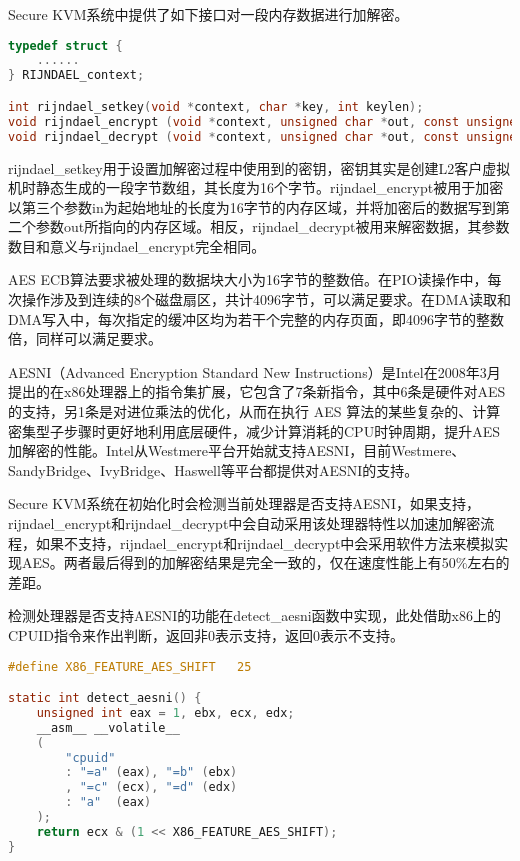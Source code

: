 Secure KVM系统中提供了如下接口对一段内存数据进行加解密。

\begin{lstlisting}[language={C}, caption={inject\_virtual\_ept\_fault实现源代码}]
typedef struct {
	......
} RIJNDAEL_context;

int rijndael_setkey(void *context, char *key, int keylen);
void rijndael_encrypt (void *context, unsigned char *out, const unsigned char *in);
void rijndael_decrypt (void *context, unsigned char *out, const unsigned char *in);
\end{lstlisting}

rijndael\_setkey用于设置加解密过程中使用到的密钥，密钥其实是创建L2客户虚拟机时静态生成的一段字节数组，其长度为16个字节。rijndael\_encrypt被用于加密以第三个参数in为起始地址的长度为16字节的内存区域，并将加密后的数据写到第二个参数out所指向的内存区域。相反，rijndael\_decrypt被用来解密数据，其参数数目和意义与rijndael\_encrypt完全相同。

AES ECB算法要求被处理的数据块大小为16字节的整数倍。在PIO读操作中，每次操作涉及到连续的8个磁盘扇区，共计4096字节，可以满足要求。在DMA读取和DMA写入中，每次指定的缓冲区均为若干个完整的内存页面，即4096字节的整数倍，同样可以满足要求。

AESNI（Advanced Encryption Standard New Instructions）是Intel在2008年3月提出的在x86处理器上的指令集扩展，它包含了7条新指令，其中6条是硬件对AES的支持，另1条是对进位乘法的优化，从而在执行 AES 算法的某些复杂的、计算密集型子步骤时更好地利用底层硬件，减少计算消耗的CPU时钟周期，提升AES加解密的性能。Intel从Westmere平台开始就支持AESNI，目前Westmere、SandyBridge、IvyBridge、Haswell等平台都提供对AESNI的支持。

Secure KVM系统在初始化时会检测当前处理器是否支持AESNI，如果支持，rijndael\_encrypt和rijndael\_decrypt中会自动采用该处理器特性以加速加解密流程，如果不支持，rijndael\_encrypt和rijndael\_decrypt中会采用软件方法来模拟实现AES。两者最后得到的加解密结果是完全一致的，仅在速度性能上有50\%左右的差距。

检测处理器是否支持AESNI的功能在detect\_aesni函数中实现，此处借助x86上的CPUID指令来作出判断，返回非0表示支持，返回0表示不支持。

\begin{lstlisting}[language={C}, caption={detect\_aesni实现源代码}]
#define X86_FEATURE_AES_SHIFT	25

static int detect_aesni() {
	unsigned int eax = 1, ebx, ecx, edx;
	__asm__ __volatile__
    (
        "cpuid"
        : "=a" (eax), "=b" (ebx)
        , "=c" (ecx), "=d" (edx)
        : "a"  (eax)
    );
    return ecx & (1 << X86_FEATURE_AES_SHIFT);
}
\end{lstlisting}

